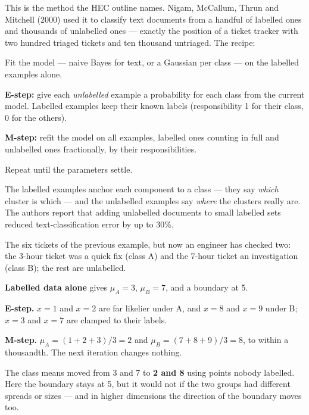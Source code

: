 This is the method the HEC outline names. Nigam, McCallum, Thrun and Mitchell (2000)
used it to classify text documents from a handful of labelled ones and thousands of
unlabelled ones --- exactly the position of a ticket tracker with two hundred
triaged tickets and ten thousand untriaged. The recipe:
\begin{tightnum}
  \item Fit the model --- naive Bayes for text, or a Gaussian per class --- on the
        labelled examples alone.
  \item \textbf{E-step:} give each \emph{unlabelled} example a probability for each
        class from the current model. Labelled examples keep their known labels
        (responsibility 1 for their class, 0 for the others).
  \item \textbf{M-step:} refit the model on all examples, labelled ones counting in
        full and unlabelled ones fractionally, by their responsibilities.
  \item Repeat until the parameters settle.
\end{tightnum}
The labelled examples anchor each component to a class --- they say \emph{which}
cluster is which --- and the unlabelled examples say \emph{where} the clusters really
are. The authors report that adding unlabelled documents to small labelled sets
reduced text-classification error by up to 30\%.

\begin{worked}
The six tickets of the previous example, but now an engineer has checked two: the
3-hour ticket was a quick fix (class A) and the 7-hour ticket an investigation
(class B); the rest are unlabelled.

\smallskip
\textbf{Labelled data alone} gives $\mu_A = 3$, $\mu_B = 7$, and a boundary at 5.

\textbf{E-step.} $x = 1$ and $x = 2$ are far likelier under A, and $x = 8$ and $x = 9$
under B; $x = 3$ and $x = 7$ are clamped to their labels.

\textbf{M-step.} $\mu_A = (1 + 2 + 3)/3 = 2$ and $\mu_B = (7 + 8 + 9)/3 = 8$, to
within a thousandth. The next iteration changes nothing.

\smallskip
The class means moved from 3 and 7 to \textbf{2 and 8} using points nobody labelled.
Here the boundary stays at 5, but it would not if the two groups had different
spreads or sizes --- and in higher dimensions the direction of the boundary moves too.
\end{worked}

